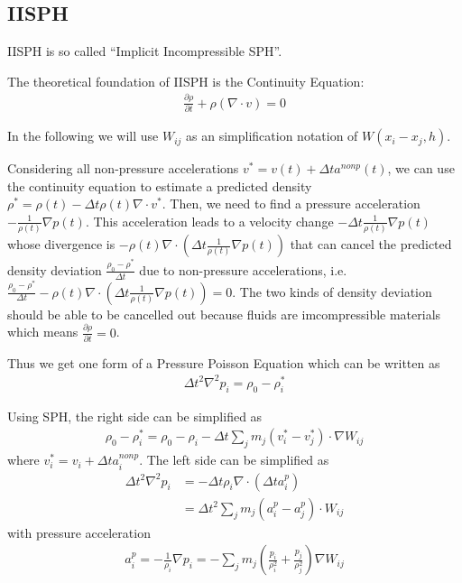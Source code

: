 \documentclass[acmlarge]{acmart}
\begin{document}
\subsection{IISPH}
IISPH is so called ``Implicit Incompressible SPH''\cite{IISPH}. 

The theoretical foundation of IISPH is the Continuity Equation:
\begin{align*}
  \frac{\partial \rho}{\partial t}+\rho(\nabla \cdot  v)=0
\end{align*}

In the following we will use $W_{ij}$ as an simplification notation of $W(x_i-x_j,h)$.

Considering all non-pressure accelerations $v^*=v(t)+\Delta t a^{nonp}(t)$, we can 
use the continuity equation to estimate a predicted density $\rho^*=\rho(t)-\Delta t\rho(t)\nabla\cdot v^*$.
Then, we need to find a pressure acceleration $-\frac{1}{\rho(t)}\nabla p(t)$.
This acceleration leads to a velocity change $-\Delta t\frac{1}{\rho(t)}\nabla p(t)$ whose divergence 
is $-\rho(t)\nabla \cdot (\Delta t\frac{1}{\rho(t)}\nabla p(t))$ that can cancel the predicted density deviation 
$\frac{\rho_0-\rho^*}{\Delta t}$
due to non-pressure accelerations, i.e. $\frac{\rho_0-\rho^*}{\Delta t}-\rho(t)\nabla \cdot (\Delta t\frac{1}{\rho(t)}\nabla p(t))=0$.
The two kinds of density deviation should be able to be cancelled out because fluids are imcompressible materials which means
$\frac{\partial \rho}{\partial t}=0$.

Thus we get one form of a Pressure Poisson Equation which can be written as 
\begin{align*}
  \Delta t^2\nabla^2 p_i=\rho_0-\rho_i^*
\end{align*}

Using SPH, the right side can be simplified as 
\begin{align*}
  \rho_0-\rho_i^*=\rho_0-\rho_i-\Delta t\sum_j m_j (v_i^*-v_j^*)\cdot \nabla W_{ij}
\end{align*}
where $v_i^*=v_i+\Delta t a_i^{nonp}$.
The left side can be simplified as
\begin{align*}
  \Delta t^2\nabla^2 p_i&=-\Delta t \rho_i\nabla\cdot(\Delta t a_i^p)\\
  &=\Delta t^2\sum_j m_j (a_i^p-a_j^p)\cdot  W_{ij}
\end{align*}
with pressure acceleration
\begin{align*}
  a_i^p=-\frac{1}{\rho_i}\nabla p_i=-\sum_j m_j(\frac{p_i}{\rho_i^2}+\frac{p_j}{\rho_j^2})\nabla W_{ij} 
\end{align*}
\end{document}
